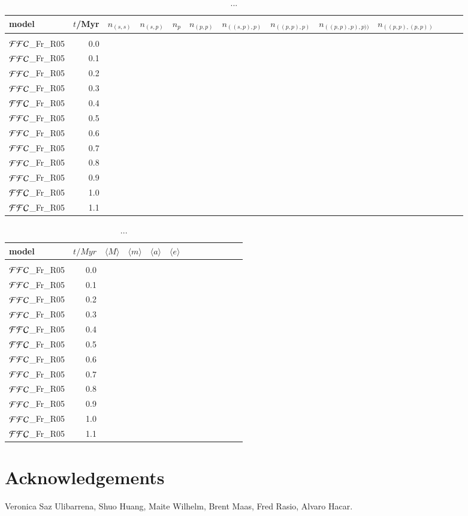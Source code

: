 \documentclass[aa]{lib/aa}
\begin{document}
\begin{table}
 \caption{...}
 \label{Tab:model_PP}
 \centering 
 \begin{tabular}{lrrrrrrrrrrrr}
   \hline\hline
   model & $t$/Myr & $n_{(s,s)}$ & $n_{(s,p)}$ & $n_{p}$ & $n_{(p,p)}$& $n_{((s,p),p)}$
   & $n_{((p,p),p)}$ & $n_{((p,p),p),p))}$ & $n_{((p,p),(p,p))}$ \\
        \hline \vspace{-0.75em}\\
${\cal FFC}$\_Fr\_R05 &  0.0 &   \\
${\cal FFC}$\_Fr\_R05 &  0.1 & \\
${\cal FFC}$\_Fr\_R05 &  0.2 &  \\
${\cal FFC}$\_Fr\_R05 &  0.3 &  \\
${\cal FFC}$\_Fr\_R05 &  0.4 &  \\
${\cal FFC}$\_Fr\_R05 &  0.5 &   \\
${\cal FFC}$\_Fr\_R05 &  0.6 &  \\
${\cal FFC}$\_Fr\_R05 &  0.7 & \\
${\cal FFC}$\_Fr\_R05 &  0.8 & \\
${\cal FFC}$\_Fr\_R05 &  0.9 & \\
${\cal FFC}$\_Fr\_R05 &  1.0 &  \\
${\cal FFC}$\_Fr\_R05 &  1.1 &  \\
\end{tabular}
\end{table}

\begin{table}
 \caption{...}
 \label{Tab:model_PP}
 \centering 
 \begin{tabular}{lrrrrrrrrrrrr}
   \hline\hline
model &$t/Myr$ & $\langle M \rangle$ & $\langle m \rangle$ & $\langle a \rangle$ & $\langle e \rangle$ \\
        \hline \vspace{-0.75em}\\
${\cal FFC}$\_Fr\_R05 &  0.0 &   \\
${\cal FFC}$\_Fr\_R05 &  0.1 &   \\
${\cal FFC}$\_Fr\_R05 &  0.2 &   \\
${\cal FFC}$\_Fr\_R05 &  0.3 &   \\
${\cal FFC}$\_Fr\_R05 &  0.4 &   \\
${\cal FFC}$\_Fr\_R05 &  0.5 &   \\
${\cal FFC}$\_Fr\_R05 &  0.6 &   \\
${\cal FFC}$\_Fr\_R05 &  0.7 &   \\
${\cal FFC}$\_Fr\_R05 &  0.8 &   \\
${\cal FFC}$\_Fr\_R05 &  0.9 &  \\
${\cal FFC}$\_Fr\_R05 &  1.0 & \\
${\cal FFC}$\_Fr\_R05 &  1.1 & \\
 \end{tabular}
\end{table}

\section*{Acknowledgements}

Veronica Saz Ulibarrena, Shuo Huang, Maite Wilhelm, Brent Maas,
Fred Rasio, Alvaro Hacar.
    

    
\end{document}
